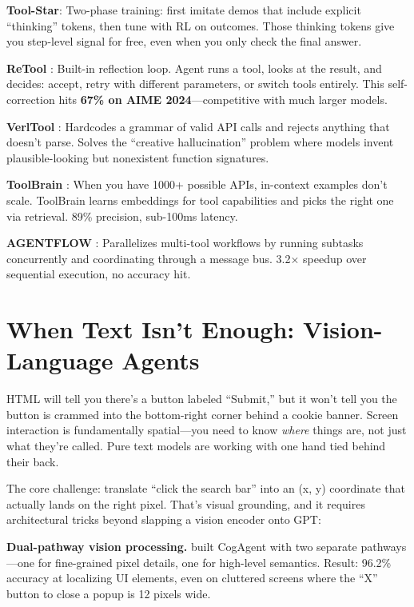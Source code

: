 \documentclass[12pt,a4paper]{report}
\theoremstyle{definition}
\begin{document}
\textbf{Tool-Star}: Two-phase training: first imitate demos that include explicit ``thinking'' tokens, then tune with RL on outcomes. Those thinking tokens give you step-level signal for free, even when you only check the final answer.

\textbf{ReTool} \cite{feng2025retool}: Built-in reflection loop. Agent runs a tool, looks at the result, and decides: accept, retry with different parameters, or switch tools entirely. This self-correction hits \textbf{67\% on AIME 2024}---competitive with much larger models.

\textbf{VerlTool} \cite{jiang2025verltool}: Hardcodes a grammar of valid API calls and rejects anything that doesn't parse. Solves the ``creative hallucination'' problem where models invent plausible-looking but nonexistent function signatures.

\textbf{ToolBrain} \cite{le2025toolbrain}: When you have 1000+ possible APIs, in-context examples don't scale. ToolBrain learns embeddings for tool capabilities and picks the right one via retrieval. 89\% precision, sub-100ms latency.

\textbf{AGENTFLOW} \cite{chen2025agentflow}: Parallelizes multi-tool workflows by running subtasks concurrently and coordinating through a message bus. 3.2$\times$ speedup over sequential execution, no accuracy hit.

\section{When Text Isn't Enough: Vision-Language Agents}
\label{sec:vision_agents}

HTML will tell you there's a button labeled ``Submit,'' but it won't tell you the button is crammed into the bottom-right corner behind a cookie banner. Screen interaction is fundamentally spatial---you need to know \textit{where} things are, not just what they're called. Pure text models are working with one hand tied behind their back.

The core challenge: translate ``click the search bar'' into an (x, y) coordinate that actually lands on the right pixel. That's visual grounding, and it requires architectural tricks beyond slapping a vision encoder onto GPT:

\textbf{Dual-pathway vision processing.} \citet{hong2023cogagent} built CogAgent with two separate pathways---one for fine-grained pixel details, one for high-level semantics. Result: 96.2\% accuracy at localizing UI elements, even on cluttered screens where the ``X'' button to close a popup is 12 pixels wide.
\end{document}
